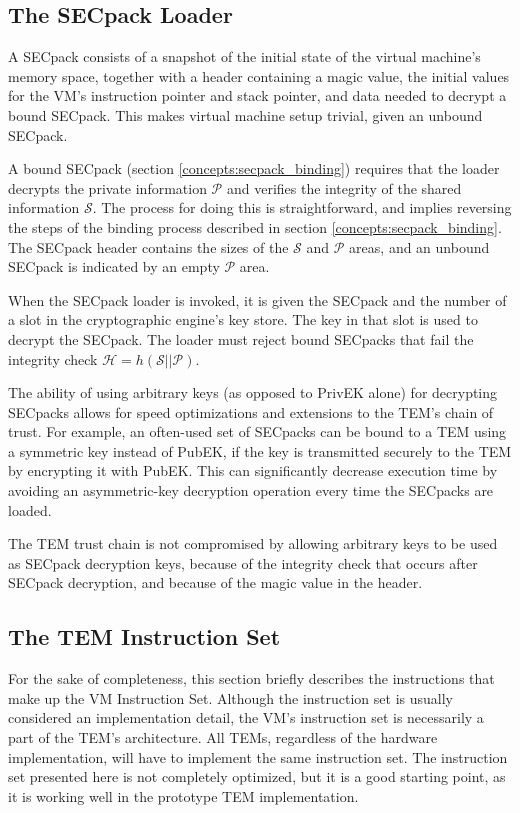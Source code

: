 \subsection{The SECpack Loader}\label{arch:secpack_loader}
A SECpack consists of a snapshot of the initial state of the virtual machine's
memory space, together with a header containing a magic value, the initial
values for the VM's instruction pointer and stack pointer, and data needed to
decrypt a bound SECpack. This makes virtual machine setup trivial, given an
unbound SECpack.

A bound SECpack (section \ref{concepts:secpack_binding}) requires that the
loader decrypts the private information $\mathcal{P}$ and verifies the
integrity of the shared information $\mathcal{S}$. The process for doing this
is straightforward, and implies reversing the steps of the binding process
described in section \ref{concepts:secpack_binding}. The SECpack header
contains the sizes of the $\mathcal{S}$ and $\mathcal{P}$ areas, and an unbound
SECpack is indicated by an empty $\mathcal{P}$ area.

When the SECpack loader is invoked, it is given the SECpack and the number of
a slot in the cryptographic engine's key store. The key in that slot is used to
decrypt the SECpack. The loader must reject bound SECpacks that fail the
integrity check $\mathcal{H} = h(\mathcal{S} || \mathcal{P})$.

The ability of using arbitrary keys (as opposed to PrivEK alone) for decrypting
SECpacks allows for speed optimizations and extensions to the TEM's chain of
trust. For example, an often-used set of SECpacks can be bound to a TEM using a
symmetric key instead of PubEK, if the key is transmitted securely to the
TEM by encrypting it with PubEK. This can significantly decrease execution time
by avoiding an asymmetric-key decryption operation every time the SECpacks are
loaded.

The TEM trust chain is not compromised by allowing arbitrary keys to be
used as SECpack decryption keys, because of the integrity check that occurs after
SECpack decryption, and because of the magic value in the header. 

\subsection{The TEM Instruction Set}
For the sake of completeness, this section briefly describes the instructions
that make up the VM Instruction Set. Although the instruction set is usually
considered an implementation detail, the VM's instruction set is necessarily a
part of the TEM's architecture. All TEMs, regardless of the hardware
implementation, will have to implement the same instruction set. The
instruction set presented here is not completely optimized, but it is a good
starting point, as it is working well in the prototype TEM implementation. 

